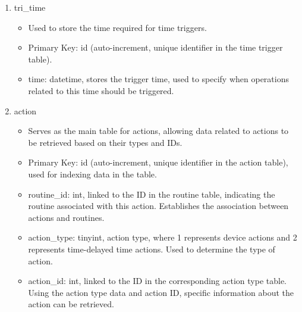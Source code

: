 \begin{enumerate}
\begin{enumerate}
              \item tri\_time
                    \begin{itemize}
                        \item Used to store the time required for time triggers.
                        \item Primary Key: id (auto-increment, unique identifier in the time trigger table).
                        \item time: datetime, stores the trigger time, used to specify when operations related to this time should be triggered.\\
                    \end{itemize}

              \item action
                    \begin{itemize}
                        \item Serves as the main table for actions, allowing data related to actions to be retrieved based on their types and IDs.
                        \item Primary Key: id (auto-increment, unique identifier in the action table), used for indexing data in the table.
                        \item routine\_id: int, linked to the ID in the routine table, indicating the routine associated with this action. Establishes the association between actions and routines.
                        \item action\_type: tinyint, action type, where 1 represents device actions and 2 represents time-delayed time actions. Used to determine the type of action.
                        \item action\_id: int, linked to the ID in the corresponding action type table. Using the action type data and action ID, specific information about the action can be retrieved.\\
                    \end{itemize}


\end{enumerate}
\end{enumerate}
